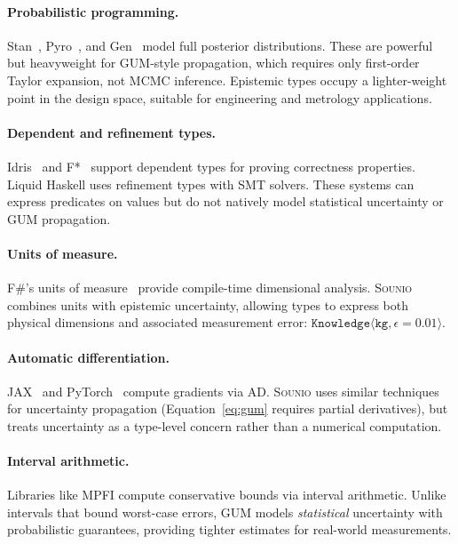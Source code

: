 \documentclass[acmsmall,screen,review,anonymous]{acmart}
\newcommand{\sounio}{\textsc{Sounio}\xspace}
\newcommand{\know}[1]{\texttt{Knowledge}\langle #1 \rangle}
\newcommand{\eps}{\epsilon}
\begin{document}
\paragraph{Probabilistic programming.}
Stan~\cite{carpenter2017stan}, Pyro~\cite{bingham2019pyro}, and
Gen~\cite{cusumano2019gen} model full posterior distributions.
These are powerful but heavyweight for GUM-style propagation, which
requires only first-order Taylor expansion, not MCMC inference.
Epistemic types occupy a lighter-weight point in the design space,
suitable for engineering and metrology applications.

\paragraph{Dependent and refinement types.}
Idris~\cite{brady2013idris} and F*~\cite{swamy2016dependent} support
dependent types for proving correctness properties.
Liquid Haskell uses refinement types with SMT solvers.
These systems can express predicates on values but do not
natively model statistical uncertainty or GUM propagation.

\paragraph{Units of measure.}
F\#'s units of measure~\cite{kennedy2009units} provide compile-time
dimensional analysis.
\sounio combines units with epistemic uncertainty, allowing types
to express both physical dimensions and associated measurement error:
$\know{\texttt{kg}, \eps=0.01}$.

\paragraph{Automatic differentiation.}
JAX~\cite{bradbury2018jax} and PyTorch~\cite{paszke2019pytorch} compute
gradients via AD.
\sounio uses similar techniques for uncertainty propagation
(Equation~\eqref{eq:gum} requires partial derivatives),
but treats uncertainty as a type-level concern rather than a
numerical computation.

\paragraph{Interval arithmetic.}
Libraries like MPFI compute conservative bounds via interval
arithmetic.
Unlike intervals that bound worst-case errors, GUM models
\emph{statistical} uncertainty with probabilistic guarantees,
providing tighter estimates for real-world measurements.
\end{document}
